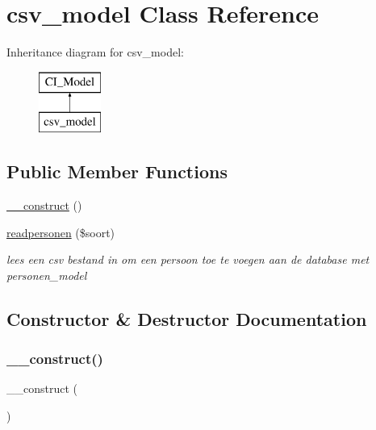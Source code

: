 \hypertarget{classcsv__model}{}\section{csv\+\_\+model Class Reference}
\label{classcsv__model}
Inheritance diagram for csv\+\_\+model\+:\begin{figure}[H]
\begin{center}
\leavevmode
\includegraphics[height=2.000000cm]{classcsv__model}
\end{center}
\end{figure}
\subsection*{Public Member Functions}
\begin{DoxyCompactItemize}
\item 
\mbox{\hyperlink{classcsv__model_a095c5d389db211932136b53f25f39685}{\+\_\+\+\_\+construct}} ()
\item 
\mbox{\hyperlink{classcsv__model_a0982b277c56508192bc564cd095e9541}{readpersonen}} (\$soort)
\begin{DoxyCompactList}\small\item\em lees een csv bestand in om een persoon toe te voegen aan de database met personen\+\_\+model \end{DoxyCompactList}\end{DoxyCompactItemize}


\subsection{Constructor \& Destructor Documentation}
\mbox{\label{classcsv__model_a095c5d389db211932136b53f25f39685}} 
\subsubsection{\texorpdfstring{\+\_\+\+\_\+construct()}{\_\_construct()}}
{\footnotesize\ttfamily \+\_\+\+\_\+construct (\begin{DoxyParamCaption}{ }\end{DoxyParamCaption})}



